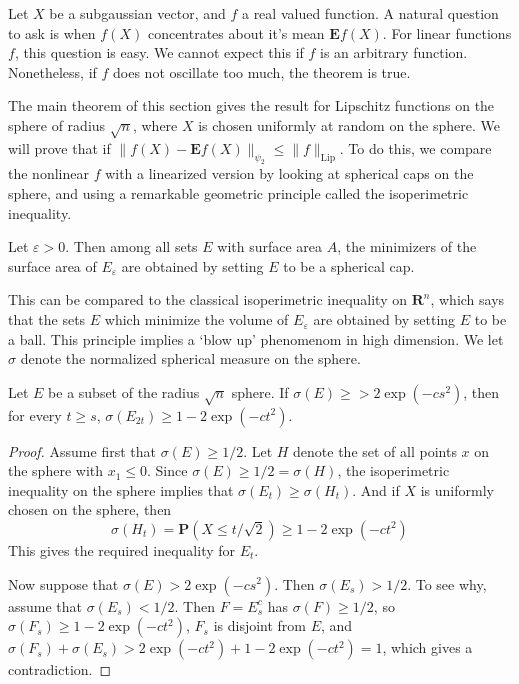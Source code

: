 Let $X$ be a subgaussian vector, and $f$ a real valued function. A natural question to ask is when $f(X)$ concentrates about it's mean $\mathbf{E} f(X)$. For linear functions $f$, this question is easy. We cannot expect this if $f$ is an arbitrary function. Nonetheless, if $f$ does not oscillate too much, the theorem is true.

The main theorem of this section gives the result for Lipschitz functions on the sphere of radius $\sqrt{n}$, where $X$ is chosen uniformly at random on the sphere. We will prove that if $\| f(X) - \mathbf{E} f(X) \|_{\psi_2} \leq \| f \|_{\text{Lip}}$. To do this, we compare the nonlinear $f$ with a linearized version by looking at spherical caps on the sphere, and using a remarkable geometric principle called the isoperimetric inequality.

\begin{theorem}
    Let $\varepsilon > 0$. Then among all sets $E$ with surface area $A$, the minimizers of the surface area of $E_\varepsilon$ are obtained by setting $E$ to be a spherical cap.
\end{theorem}

This can be compared to the classical isoperimetric inequality on $\mathbf{R}^n$, which says that the sets $E$ which minimize the volume of $E_\varepsilon$ are obtained by setting $E$ to be a ball. This principle implies a `blow up' phenomenom in high dimension. We let $\sigma$ denote the normalized spherical measure on the sphere.

\begin{theorem}
    Let $E$ be a subset of the radius $\sqrt{n}$ sphere. If $\sigma(E) \geq > 2 \exp(-cs^2)$, then for every $t \geq s$, $\sigma(E_{2t}) \geq 1-2\exp(-ct^2)$.
\end{theorem}
\begin{proof}
    Assume first that $\sigma(E) \geq 1/2$. Let $H$ denote the set of all points $x$ on the sphere with $x_1 \leq 0$. Since $\sigma(E) \geq 1/2 = \sigma(H)$, the isoperimetric inequality on the sphere implies that $\sigma(E_t) \geq \sigma(H_t)$. And if $X$ is uniformly chosen on the sphere, then
    \[ \sigma(H_t) = \mathbf{P}(X \leq t/\sqrt{2}) \geq 1 - 2\exp(-ct^2) \]
    This gives the required inequality for $E_t$.

    Now suppose that $\sigma(E) > 2\exp(-cs^2)$. Then $\sigma(E_s) > 1/2$. To see why, assume that $\sigma(E_s) < 1/2$. Then $F = E_s^c$ has $\sigma(F) \geq 1/2$, so $\sigma(F_s) \geq 1 - 2\exp(-ct^2)$, $F_s$ is disjoint from $E$, and $\sigma(F_s) + \sigma(E_s) > 2\exp(-ct^2) + 1 - 2\exp(-ct^2) = 1$, which gives a contradiction.
\end{proof}

